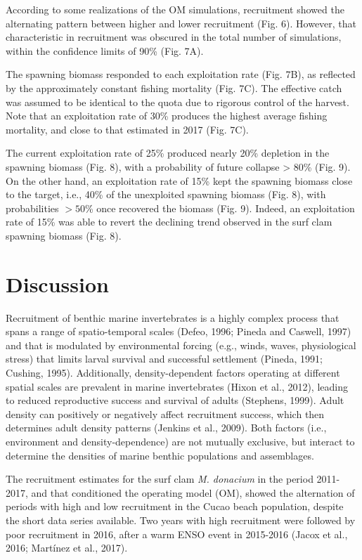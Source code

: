 \documentclass[12pt]{article}
\begin{document}
According to some realizations of the OM simulations, recruitment showed
the alternating pattern between higher and lower recruitment (Fig. 6).
However, that characteristic in recruitment was obscured in the total
number of simulations, within the confidence limits of 90\% (Fig. 7A).

The spawning biomass responded to each exploitation rate (Fig. 7B), as
reflected by the approximately constant fishing mortality (Fig. 7C). The
effective catch was assumed to be identical to the quota due to rigorous
control of the harvest. Note that an exploitation rate of 30\% produces
the highest average fishing mortality, and close to that estimated in
2017 (Fig. 7C).

The current exploitation rate of 25\% produced nearly 20\% depletion in
the spawning biomass (Fig. 8), with a probability of future collapse
\textgreater{} 80\% (Fig. 9). On the other hand, an exploitation rate of
15\% kept the spawning biomass close to the target, i.e., 40\% of the
unexploited spawning biomass (Fig. 8), with probabilities \(>50\)\% once
recovered the biomass (Fig. 9). Indeed, an exploitation rate of 15\% was
able to revert the declining trend observed in the surf clam spawning
biomass (Fig. 8).

\FloatBarrier

\hypertarget{discussion}{%
\section{Discussion}\label{discussion}}

Recruitment of benthic marine invertebrates is a highly complex process
that spans a range of spatio-temporal scales (Defeo, 1996; Pineda and
Caswell, 1997) and that is modulated by environmental forcing (e.g.,
winds, waves, physiological stress) that limits larval survival and
successful settlement (Pineda, 1991; Cushing, 1995). Additionally,
density-dependent factors operating at different spatial scales are
prevalent in marine invertebrates (Hixon et al., 2012), leading to
reduced reproductive success and survival of adults (Stephens, 1999).
Adult density can positively or negatively affect recruitment success,
which then determines adult density patterns (Jenkins et al., 2009).
Both factors (i.e., environment and density-dependence) are not mutually
exclusive, but interact to determine the densities of marine benthic
populations and assemblages.

The recruitment estimates for the surf clam \emph{M. donacium} in the
period 2011-2017, and that conditioned the operating model (OM), showed
the alternation of periods with high and low recruitment in the Cucao
beach population, despite the short data series available. Two years
with high recruitment were followed by poor recruitment in 2016, after a
warm ENSO event in 2015-2016 (Jacox et al., 2016; Martínez et al.,
2017).
\end{document}
